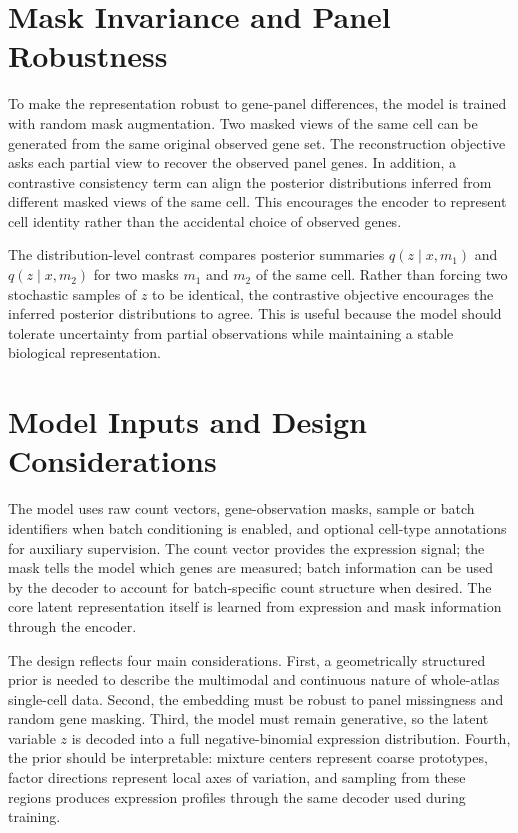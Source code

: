 \documentclass[11pt]{article}
\begin{document}
\section{Mask Invariance and Panel Robustness}

To make the representation robust to gene-panel differences, the model is trained with random mask augmentation. Two masked views of the same cell can be generated from the same original observed gene set. The reconstruction objective asks each partial view to recover the observed panel genes. In addition, a contrastive consistency term can align the posterior distributions inferred from different masked views of the same cell. This encourages the encoder to represent cell identity rather than the accidental choice of observed genes.

The distribution-level contrast compares posterior summaries $q(z \mid x,m_1)$ and $q(z \mid x,m_2)$ for two masks $m_1$ and $m_2$ of the same cell. Rather than forcing two stochastic samples of $z$ to be identical, the contrastive objective encourages the inferred posterior distributions to agree. This is useful because the model should tolerate uncertainty from partial observations while maintaining a stable biological representation.

\section{Model Inputs and Design Considerations}

The model uses raw count vectors, gene-observation masks, sample or batch identifiers when batch conditioning is enabled, and optional cell-type annotations for auxiliary supervision. The count vector provides the expression signal; the mask tells the model which genes are measured; batch information can be used by the decoder to account for batch-specific count structure when desired. The core latent representation itself is learned from expression and mask information through the encoder.

The design reflects four main considerations. First, a geometrically structured prior is needed to describe the multimodal and continuous nature of whole-atlas single-cell data. Second, the embedding must be robust to panel missingness and random gene masking. Third, the model must remain generative, so the latent variable $z$ is decoded into a full negative-binomial expression distribution. Fourth, the prior should be interpretable: mixture centers represent coarse prototypes, factor directions represent local axes of variation, and sampling from these regions produces expression profiles through the same decoder used during training.
\end{document}
